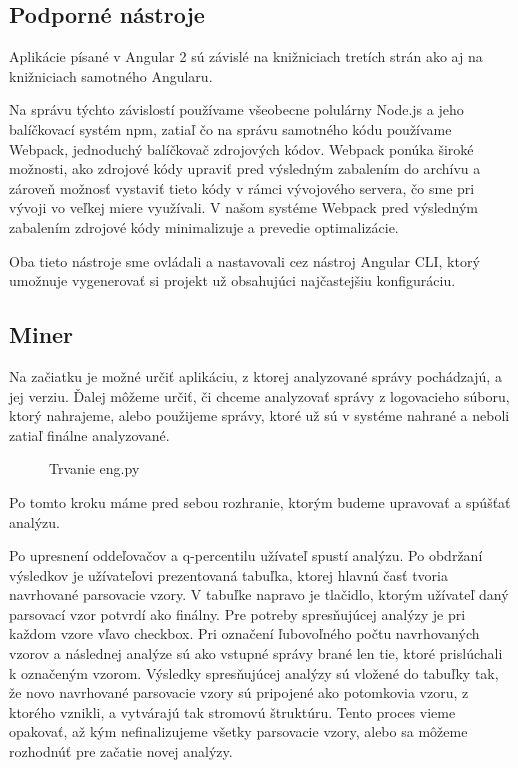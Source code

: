 \subsection{Podporné nástroje}
Aplikácie písané v Angular 2 sú závislé na knižniciach tretích strán ako aj na knižniciach samotného Angularu. 
\par Na správu týchto závislostí používame všeobecne polulárny Node.js a jeho balíčkovací systém npm, zatiaľ čo na správu samotného kódu používame Webpack, jednoduchý balíčkovač zdrojových kódov. Webpack ponúka široké možnosti, ako zdrojové kódy upraviť pred výsledným zabalením do archívu a zároveň možnosť vystaviť tieto kódy v rámci vývojového servera, čo sme pri vývoji vo veľkej miere využívali. V našom systéme Webpack pred výsledným zabalením zdrojové kódy minimalizuje a prevedie optimalizácie.
\par Oba tieto nástroje sme ovládali a nastavovali cez nástroj Angular CLI, ktorý umožnuje vygenerovať si projekt už obsahujúci najčastejšiu konfiguráciu. 


\subsection{Miner}
Na začiatku je možné určiť aplikáciu, z ktorej analyzované správy pochádzajú, a jej verziu. Ďalej môžeme určiť, či chceme analyzovať správy z logovacieho súboru, ktorý nahrajeme, alebo použijeme správy, ktoré už sú v systéme nahrané a neboli zatiaľ finálne analyzované.

\begin{figure}[htbp]
 \centering 
 \begin{minipage}{0.95\linewidth}
 	\centering
 \end{minipage}
  \caption{Trvanie eng.py }
  \label{fig:eng-duration}
\end{figure}

Po tomto kroku máme pred sebou rozhranie, ktorým budeme upravovať a spúšťať analýzu. 
\par Po upresnení oddeľovačov a q-percentilu užívateľ spustí analýzu. Po obdržaní výsledkov je užívateľovi prezentovaná tabuľka, ktorej hlavnú časť tvoria navrhované parsovacie vzory. V tabuľke napravo je tlačidlo, ktorým užívateľ daný parsovací vzor potvrdí ako finálny. Pre potreby spresňujúcej analýzy je pri každom vzore vľavo checkbox. Pri označení ľubovoľného počtu navrhovaných vzorov a následnej analýze sú ako vstupné správy brané len tie, ktoré prislúchali k označeným vzorom. Výsledky spresňujúcej analýzy sú vložené do tabuľky tak, že novo navrhované parsovacie vzory sú pripojené ako potomkovia vzoru, z ktorého vznikli, a vytvárajú tak stromovú štruktúru. Tento proces vieme opakovať, až kým nefinalizujeme všetky parsovacie vzory, alebo sa môžeme rozhodnúť pre začatie novej analýzy.

